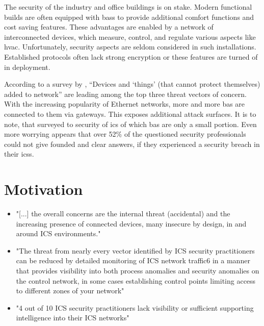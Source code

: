 
The security of the industry and office buildings is on stake.
Modern functional builds are often equipped with \glspl{bas} to provide additional comfort functions and cost saving features.
These advantages are enabled by a network of interconnected devices, which measure, control, and regulate various aspects like \gls{hvac}.
Unfortunately, security aspects are seldom considered in such installations. \parencite{Brandstetter2017}
Established protocols often lack strong encryption or these features are turned of in deployment.

According to a survey by \textcite{Gregory-Brown2017}, \enquote{Devices and \enquote{things} (that cannot protect themselves) added to network} are leading among the top three threat vectors of concern.
With the increasing popularity of Ethernet networks, more and more \gls{bas} are connected to them via gateways. This exposes additional attack surfaces.
It is to note, that \textcite{Gregory-Brown2017} surveyed to security of \gls{ics} of which \gls{bas} are only a small portion.
Even more worrying appears that over 52\% of the questioned security professionals could not give founded and clear answers, if they experienced a security breach in their \glspl{ics}.

\section{Motivation}
\begin{itemize}
	
	\item "[...] the overall concerns are the internal threat (accidental) and the increasing presence of connected devices, many insecure by design, in and around ICS environments." \parencite[p.~9]{Gregory-Brown2017}
	\item "The threat from nearly every vector identified by ICS security practitioners can be reduced by detailed monitoring of ICS network traffic6 in a manner that provides visibility into both process anomalies and security anomalies on the control network, in some cases establishing control points limiting access to different zones of your network" \parencite[p.~10]{Gregory-Brown2017}
	\item "4 out of 10 ICS security practitioners lack visibility or sufficient supporting intelligence into their ICS networks" \parencite[p.~13]{Gregory-Brown2017}
\end{itemize}

